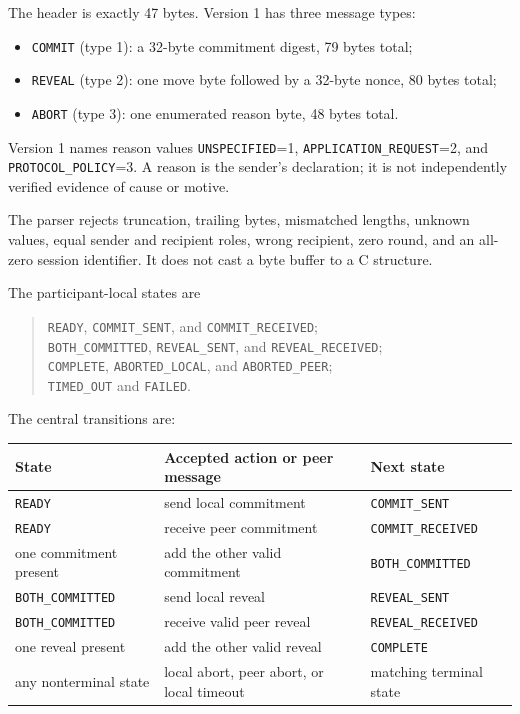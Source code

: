 The header is exactly 47 bytes. Version 1 has three message types:

\begin{itemize}
    \item \texttt{COMMIT} (type 1): a 32-byte commitment digest, 79 bytes
    total;
    \item \texttt{REVEAL} (type 2): one move byte followed by a 32-byte
    nonce, 80 bytes total;
    \item \texttt{ABORT} (type 3): one enumerated reason byte, 48 bytes
    total.
\end{itemize}

Version 1 names reason values \texttt{UNSPECIFIED}=1,
\texttt{APPLICATION\_REQUEST}=2, and \texttt{PROTOCOL\_POLICY}=3. A reason is
the sender's declaration; it is not independently verified evidence of cause
or motive.

The parser rejects truncation, trailing bytes, mismatched lengths, unknown
values, equal sender and recipient roles, wrong recipient, zero round, and an
all-zero session identifier. It does not cast a byte buffer to a C structure.

The participant-local states are

\begin{quote}
\raggedright
\texttt{READY}, \texttt{COMMIT\_SENT}, and
\texttt{COMMIT\_RECEIVED};\\
\texttt{BOTH\_COMMITTED}, \texttt{REVEAL\_SENT}, and
\texttt{REVEAL\_RECEIVED};\\
\texttt{COMPLETE}, \texttt{ABORTED\_LOCAL}, and
\texttt{ABORTED\_PEER};\\
\texttt{TIMED\_OUT} and \texttt{FAILED}.
\end{quote}

The central transitions are:

\begin{center}
\small
\begin{tabular}{|>{\raggedright\arraybackslash}p{}|
                  >{\raggedright\arraybackslash}p{}|
                  >{\raggedright\arraybackslash}p{}|}
\hline
State & Accepted action or peer message & Next state \\
\hline
\texttt{READY} & send local commitment & \texttt{COMMIT\_SENT} \\
\hline
\texttt{READY} & receive peer commitment & \texttt{COMMIT\_RECEIVED} \\
\hline
one commitment present & add the other valid commitment & \texttt{BOTH\_COMMITTED} \\
\hline
\texttt{BOTH\_COMMITTED} & send local reveal & \texttt{REVEAL\_SENT} \\
\hline
\texttt{BOTH\_COMMITTED} & receive valid peer reveal & \texttt{REVEAL\_RECEIVED} \\
\hline
one reveal present & add the other valid reveal & \texttt{COMPLETE} \\
\hline
any nonterminal state & local abort, peer abort, or local timeout & matching terminal state \\
\hline
\end{tabular}
\end{center}

